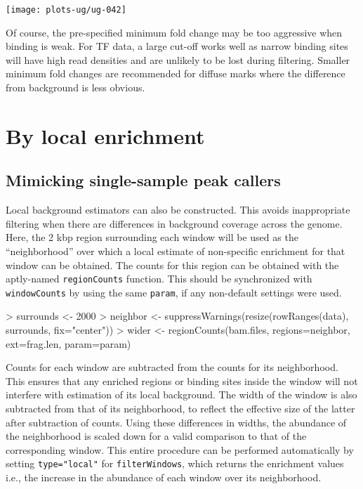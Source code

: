 \documentclass[12pt]{report}
\renewenvironment{Schunk}{\vspace{0pt}}{\vspace{0pt}}
\newcommand{\code}[1]{{\small\texttt{#1}}}
\begin{document}
\begin{center}
\texttt{[image: plots-ug/ug-042]}
\end{center}

Of course, the pre-specified minimum fold change may be too aggressive when binding is weak. 
For TF data, a large cut-off works well as narrow binding sites will have high read densities and are unlikely to be lost during filtering. 
Smaller minimum fold changes are recommended for diffuse marks where the difference from background is less obvious. 

\section{By local enrichment}

\subsection{Mimicking single-sample peak callers}
Local background estimators can also be constructed.
This avoids inappropriate filtering when there are differences in background coverage across the genome. 
Here, the 2 kbp region surrounding each window will be used as the ``neighborhood'' over which a local estimate of non-specific enrichment for that window can be obtained. 
The counts for this region can be obtained with the aptly-named \code{regionCounts} function.
This should be synchronized with \code{windowCounts} by using the same \code{param}, if any non-default settings were used.

\begin{Schunk}
\begin{Sinput}
> surrounds <- 2000
> neighbor <- suppressWarnings(resize(rowRanges(data), surrounds, fix="center"))
> wider <- regionCounts(bam.files, regions=neighbor, ext=frag.len, param=param)
\end{Sinput}
\end{Schunk}

Counts for each window are subtracted from the counts for its neighborhood.
This ensures that any enriched regions or binding sites inside the window will not interfere with estimation of its local background.
The width of the window is also subtracted from that of its neighborhood, to reflect the effective size of the latter after subtraction of counts.
Using these differences in widths, the abundance of the neighborhood is scaled down for a valid comparison to that of the corresponding window.
This entire procedure can be performed automatically by setting \code{type="local"} for \code{filterWindows}, which returns the enrichment values i.e., the increase in the abundance of each window over its neighborhood.
\end{document}
